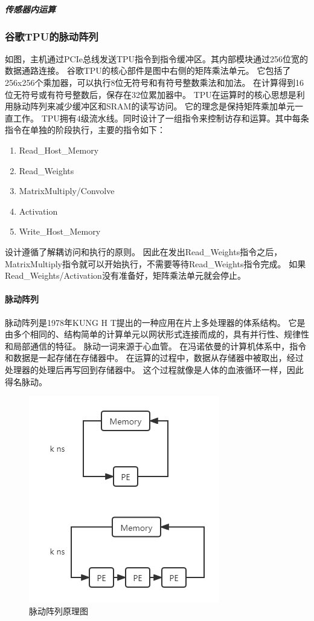 \subparagraph{传感器内运算}


\subsubsection{谷歌TPU的脉动阵列}
如图，主机通过PCIe总线发送TPU指令到指令缓冲区。其内部模块通过256位宽的数据通路连接。
谷歌TPU的核心部件是图中右侧的矩阵乘法单元。
它包括了256x256个乘加器，可以执行8位无符号和有符号整数乘法和加法。
在计算得到16位无符号或有符号整数后，保存在32位累加器中。
TPU在运算时的核心思想是利用脉动阵列来减少缓冲区和SRAM的读写访问。
它的理念是保持矩阵乘加单元一直工作。
TPU拥有4级流水线。同时设计了一组指令来控制访存和运算。其中每条指令在单独的阶段执行，主要的指令如下：
\begin{enumerate}
    \item Read\_Host\_Memory
    \item Read\_Weights
    \item MatrixMultiply/Convolve
    \item Activation
    \item Write\_Host\_Memory
\end{enumerate}
设计遵循了解耦访问和执行的原则。
因此在发出Read\_Weights指令之后，MatrixMultiply指令就可以开始执行，不需要等待Read\_Weights指令完成。
如果Read\_Weights/Activation没有准备好，矩阵乘法单元就会停止。

\paragraph{脉动阵列}
脉动阵列\cite{1978Systolic}是1978年KUNG H T提出的一种应用在片上多处理器的体系结构。
它是由多个相同的、结构简单的计算单元以网状形式连接而成的，具有并行性、规律性和局部通信的特征。
脉动一词来源于心血管。
在冯诺依曼的计算机体系中，指令和数据是一起存储在存储器中。
在运算的过程中，数据从存储器中被取出，经过处理器的处理后再写回到存储器中。
这个过程就像是人体的血液循环一样，因此得名脉动。  
\begin{figure}[htbp]
    \centering
    \includegraphics[]{figures/systolic_array.png}
    \caption{脉动阵列原理图}
    \label{systolic}
\end{figure}   

